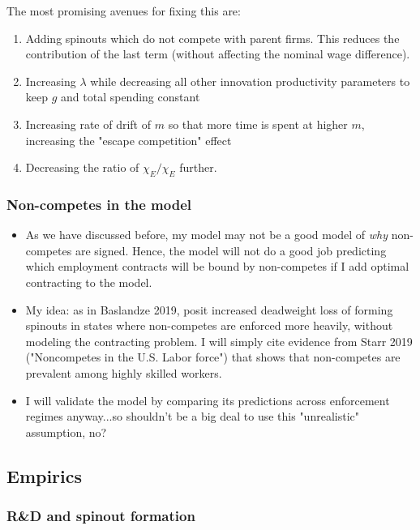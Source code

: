 \documentclass[12pt,english]{article}
\theoremstyle{remark}
\begin{document}
The most promising avenues for fixing this are: 
\begin{enumerate}
	\item Adding spinouts which do not compete with parent firms. This reduces the contribution of the last term (without affecting the nominal wage difference).
	\item Increasing $\lambda$ while decreasing all other innovation productivity parameters to keep $g$ and total spending constant
	\item Increasing rate of drift of $m$ so that more time is spent at higher $m$, increasing the "escape competition" effect
	\item Decreasing the ratio of $\chi_E / \chi_E$ further. 
\end{enumerate}



\subsubsection{Non-competes in the model}

\begin{itemize}
	\item As we have discussed before, my model may not be a good model of \textit{why} non-competes are signed. Hence, the model will not do a good job predicting which employment contracts will be bound by non-competes if I add optimal contracting to the model. 
	\item My idea: as in Baslandze 2019, posit increased deadweight loss of forming spinouts in states where non-competes are enforced more heavily, without modeling the contracting problem. I will simply cite evidence from Starr 2019 ("Noncompetes in the U.S. Labor force") that shows that non-competes are prevalent among highly skilled workers. 
	\item I will validate the model by comparing its predictions across enforcement regimes anyway...so shouldn't be a big deal to use this "unrealistic" assumption, no?
\end{itemize}

\subsection{Empirics}

\subsubsection{R\&D and spinout formation}
\end{document}
